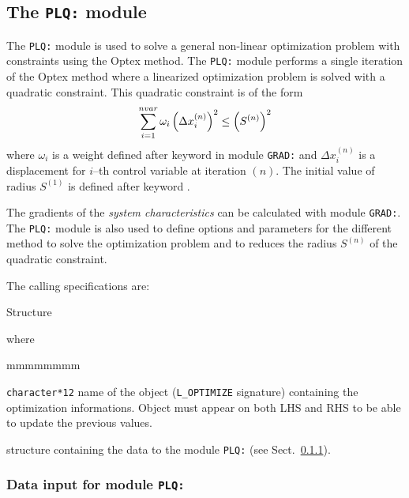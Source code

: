 \subsection{The \texttt{PLQ:} module}

The {\tt PLQ:} module is used to solve a general non-linear optimization problem with constraints using the Optex method.\cite{optex1,optex2,optex3,PIP2016}
The {\tt PLQ:} module performs a single iteration of the Optex method where a linearized optimization problem is solved with a quadratic constraint.
This quadratic constraint is of the form
$$
\sum_{i=1}^{\sl nvar} \omega_i \left( \Delta x_i^{(n)}\right)^2 \le \left( S^{(n)}\right)^2
$$
\noindent where $\omega_i$ is a weight defined after keyword  in module {\tt GRAD:} and $\Delta x_i^{(n)}$ is a displacement for
$i$--th control variable at iteration $(n)$. The initial value of radius $S^{(1)}$ is defined after keyword .

\vskip 0.08cm

The gradients of the {\sl system characteristics} can be calculated with module {\tt GRAD:}. The {\tt PLQ:} module is also used to
define options and parameters for the different method to solve the optimization problem and to reduces the radius $S^{(n)}$ of
the quadratic constraint.

\vskip 0.08cm

The calling specifications are:

\begin{DataStructure}{Structure }
 \moc{:=}   \moc{::} 
\end{DataStructure}

\noindent where

\begin{ListeDeDescription}{mmmmmmmm}

\item[\dusa{OPTIM}] \texttt{character*12} name of the  object ({\tt L\_OPTIMIZE} signature) containing the
optimization informations. Object  must appear on both LHS and RHS to be able to update the previous values.

\item[\dstr{plq\_data}] structure containing the data to the module \texttt{PLQ:} (see Sect.~\ref{sect:plq_data}).

\end{ListeDeDescription}
\vskip 0.2cm

\subsubsection{Data input for module \texttt{PLQ:}}\label{sect:plq_data}


